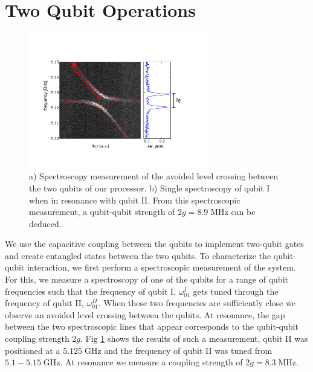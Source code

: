 \section{Two Qubit Operations}

\begin{figure}[ht!]
	\centering
		\includegraphics[width=0.7\textwidth]{"./data/ct5/2011_04_11 - anticrossing/qubit_anticrossing_modified"}
	\caption[Spectroscopic measurement of the avoided level crossing between the two qubits of our processor]{a) Spectroscopy measurement of the avoided level crossing between the two qubits of our processor. b) Single spectroscopy of qubit I when in resonance with qubit II. From this spectroscopic measurement, a qubit-qubit strength of $2g=8.9\;\mathrm{MHz}$ can be deduced. }
	\label{fig:qubit_anticrossing}
\end{figure}

We use the capacitive coupling between the qubits to implement two-qubit gates and create entangled states between the two qubits. To characterize the qubit-qubit interaction, we first perform a spectroscopic measurement of the system. For this, we measure a spectroscopy of one of the qubits for a range of qubit frequencies such that the frequency of qubit I, $\omega_{01}^I$ gets tuned through the frequency of qubit II, $\omega_{01}^{II}$. When these two frequencies are sufficiently close we observe an avoided level crossing between the qubits. At resonance, the gap between the two spectroscopic lines that appear corresponds to the qubit-qubit coupling strength $2g$. Fig \ref{fig:qubit_anticrossing} shows the results of such a measurement, qubit II was positioned at a $5.125\;\mathrm{GHz}$ and the frequency of qubit II was tuned from $5.1-5.15\;\mathrm{GHz}$. At resonance we measure a coupling strength of $2g = 8.3\;\mathrm{MHz}$.

\smallskip

